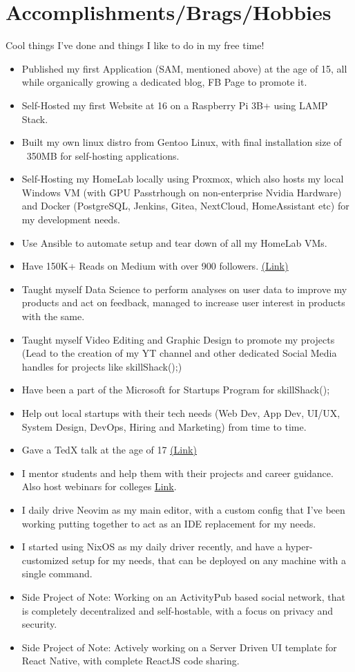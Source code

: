 \documentclass[a4paper,11pt]{article}
\newcommand{\resumeItem}[1]{
  \item\large{#1}
}
\newcommand{\resumeItemListStart}{\begin{itemize}[rightmargin=0.11in]}
\newcommand{\resumeItemListEnd}{\end{itemize}}
\begin{document}
\section{\LARGE{Accomplishments/Brags/Hobbies}}
\large{Cool things I've done and things I like to do in my free time!}
\resumeItemListStart{}
	\resumeItem{Published my first Application (SAM, mentioned above) at the age of 15, all while organically growing a dedicated blog, FB Page to promote it.}
\resumeItem{Self-Hosted my first Website at 16 on a Raspberry Pi 3B+ using LAMP Stack.}
\resumeItem{Built my own linux distro from Gentoo Linux, with final installation size of ~350MB for self-hosting applications.}
\resumeItem{Self-Hosting my HomeLab locally using Proxmox, which also hosts my local Windows VM (with GPU Passtrhough on non-enterprise Nvidia Hardware) and Docker (PostgreSQL, Jenkins, Gitea, NextCloud, HomeAssistant etc) for my development needs.}
\resumeItem{Use Ansible to automate setup and tear down of all my HomeLab VMs.}
\resumeItem{Have 150K+ Reads on Medium with over 900 followers. \href{https://medium.com/@sushrit.pk21}{\uline{(Link)}}}
\resumeItem{Taught myself Data Science to perform analyses on user data to improve my products and act on feedback, managed to increase user interest in products with the same.}
\resumeItem{Taught myself Video Editing and Graphic Design to promote my projects (Lead to the creation of my YT channel and other dedicated Social Media handles for projects like skillShack();)}
\resumeItem{Have been a part of the Microsoft for Startups Program for skillShack();}
\resumeItem{Help out local startups with their tech needs (Web Dev, App Dev, UI/UX, System Design, DevOps, Hiring and Marketing) from time to time.}
\resumeItem{Gave a TedX talk at the age of 17 \href{https://www.youtube.com/watch?v=0XXque5QdHg}{\uline{(Link)}}}
\resumeItem{I mentor students and help them with their projects and career guidance. Also host webinars for colleges \href{https://www.youtube.com/watch?v=l673uNfDLX8}{\uline{Link}}.}
\resumeItem{I daily drive Neovim as my main editor, with a custom config that I've been working putting together to act as an IDE replacement for my needs.}
\resumeItem{I started using NixOS as my daily driver recently, and have a hyper-customized setup for my needs, that can be deployed on any machine with a single command.}
\resumeItem{Side Project of Note: Working on an ActivityPub based social network, that is completely decentralized and self-hostable, with a focus on privacy and security.}
\resumeItem{Side Project of Note: Actively working on a Server Driven UI template for React Native, with complete ReactJS code sharing.}
\resumeItemListEnd{}

\end{document}
